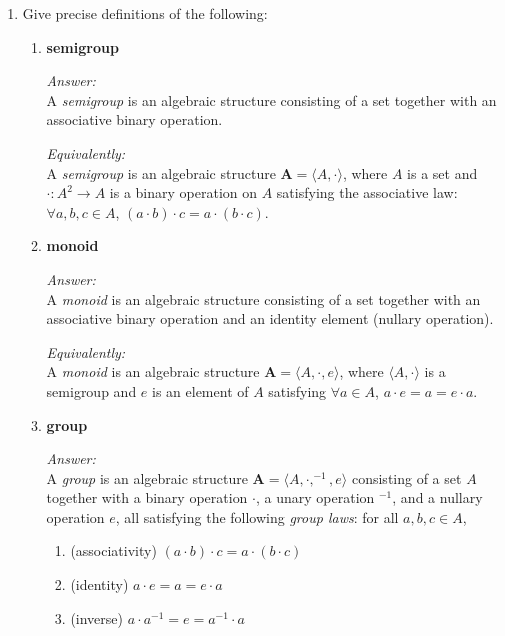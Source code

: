 \documentclass[12pt]{article}
\newcommand{\<}{\ensuremath{\langle}}
\renewcommand{\>}{\ensuremath{\rangle}}
\newcommand{\bA}{\ensuremath{\mathbf{A}}}
\begin{document}
\begin{enumerate}[{\bf 1.}]
\item Give precise definitions of the following:

  \begin{enumerate}
  \item {\bf semigroup}

    \medskip

    {\it Answer:}\\
    A \emph{semigroup} is an algebraic structure consisting of a
    set together with an associative binary operation.

    {\it Equivalently:} \\
    A \emph{semigroup} is an algebraic structure 
    $\mathbf{A} = \<A, \cdot\>$, where $A$ is a set and 
    $\cdot: A^2 \rightarrow A$ is a binary operation on $A$ satisfying the
    associative law: $\forall a, b, c \in A$, 
    $(a \cdot b) \cdot c = a \cdot (b \cdot c)$.

    \medskip

  \item {\bf monoid}

    \medskip

    {\it Answer:}\\
    A \emph{monoid} is an algebraic structure consisting of a set together with an
    associative binary operation and an identity element (nullary operation). 

    {\it Equivalently:}\\
    A \emph{monoid} is an algebraic structure 
    $\mathbf{A} = \<A, \cdot, e\>$, where $\<A, \cdot\>$ is a semigroup and 
    $e$ is an element of $A$ satisfying $\forall a \in A$, $a\cdot e = a = e\cdot a$.

    \medskip

  \item {\bf group}

    \medskip
    
    {\it Answer:}\\
    A \emph{group} is an algebraic structure 
    $\bA = \langle A, \cdot, ^{-1}, e\rangle$
    consisting of a set $A$ together with a 
    binary operation $\cdot$, a unary operation 
    $^{-1}$, and a nullary operation $e$, all satisfying
    the following \emph{group laws}: for all $a, b, c \in A$,
    \begin{enumerate}
    \item (associativity) $(a \cdot b) \cdot c = a \cdot (b \cdot c)$ 
    \item (identity) $a\cdot e = a = e\cdot a$
    \item (inverse) $a\cdot a^{-1} = e = a^{-1}\cdot a$
    \end{enumerate}


\end{enumerate}
\end{enumerate}
\end{document}
